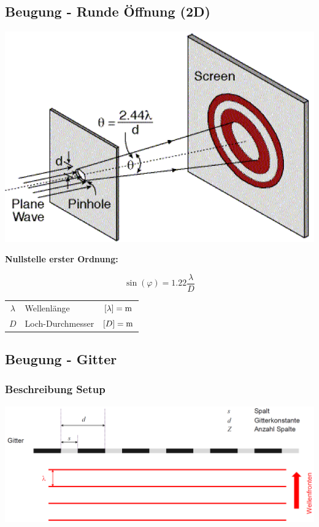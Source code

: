 

\subsection{Beugung - Runde Öffnung (2D)}

\begin{minipage}{0.48\linewidth}
\includegraphics[width=0.98\linewidth]{Bilder/Wellen-Optik/beugung_loch} \\
\end{minipage}
\hfill
\begin{minipage}{0.48\linewidth}
\textbf{Nullstelle erster Ordnung:} 

$$ \boxed{ \sin(\varphi) = 1.22 \frac{\lambda}{D} } $$ 
\end{minipage}


\renewcommand{\arraystretch}{1.1}
\begin{tabular}{clc}
$\lambda$ & Wellenlänge & $[\lambda]= \mathrm{m}$ \\
$D$ & Loch-Durchmesser & $[D] = \mathrm{m}$
\end{tabular}
\renewcommand{\arraystretch}{1}



\subsection{Beugung - Gitter}

\subsubsection{Beschreibung Setup}
\includegraphics[width=0.9\linewidth]{Bilder/Wellen-Optik/beugung_gitter} 


